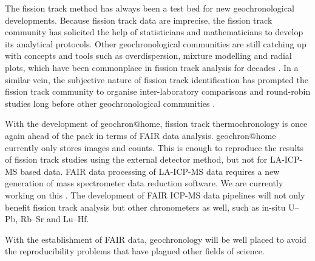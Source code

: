 \documentclass[gchron, manuscript]{copernicus}
\begin{document}
The fission track method has always been a test bed for new
geochronological developments.  Because fission track data are
imprecise, the fission track community has solicited the help of
statisticians and mathematicians to develop its analytical protocols.
Other geochronological communities are still catching up with concepts
and tools such as overdispersion, mixture modelling and radial plots,
which have been commonplace in fission track analysis for decades
\citep{vermeesch2019b}. In a similar vein, the subjective nature of
fission track identification has prompted the fission track community
to organise inter-laboratory comparisons and round-robin studies long
before other geochronological communities
\citep{miller1985,tamer2025}.\medskip

With the development of geochron@home, fission track thermochronology
is once again ahead of the pack in terms of FAIR data analysis.
geochron@home currently only stores images and counts. This is enough
to reproduce the results of fission track studies using the external
detector method, but not for LA-ICP-MS based data. FAIR data
processing of LA-ICP-MS data requires a new generation of mass
spectrometer data reduction software. We are currently working on this
\citep{vermeesch2025b}. The development of FAIR ICP-MS data pipelines
will not only benefit fission track analysis but other chronometers as
well, such as in-situ U--Pb, Rb--Sr and Lu--Hf.\medskip

With the establishment of FAIR data, geochronology will be well placed
to avoid the reproducibility problems that have plagued other fields
of science.



\end{document}
